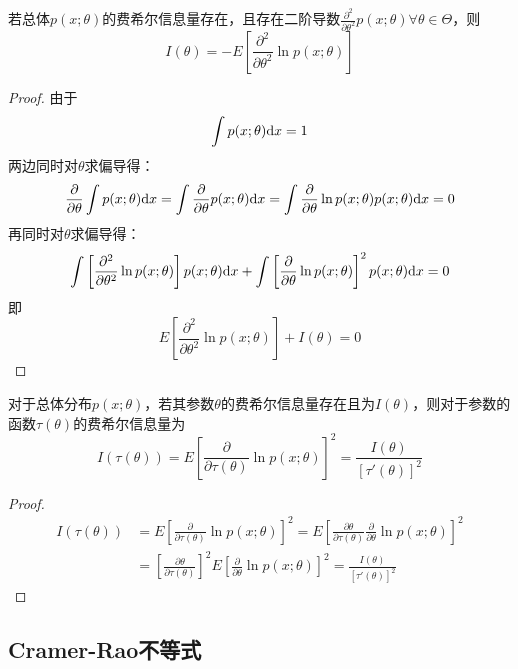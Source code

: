 \begin{proposition}
    若总体$p(x;\theta)$的费希尔信息量存在，且存在二阶导数$\frac{\partial^2}{\partial \theta^2}p(x;\theta) \forall \theta \in \Theta$，则
    \[ I(\theta)=-E\left[ \frac{\partial^2}{\partial \theta^2}\ln p(x;\theta) \right]  \]
\end{proposition}
\begin{proof}
    由于
    \[ \int p(x;\theta) \mathrm{d} x = 1 \]
    两边同时对$\theta$求偏导得：
    \[ \frac{\partial}{\partial \theta}\int p(x;\theta) \mathrm{d} x = \int \frac{\partial}{\partial \theta}p(x;\theta) \mathrm{d} x = \int \frac{\partial}{\partial \theta}\ln p(x;\theta) p(x;\theta) \mathrm{d} x=0 \]
    再同时对$\theta$求偏导得：
    \[ \int \left[ \frac{\partial^2}{\partial \theta^2}\ln p(x;\theta) \right] p(x;\theta) \mathrm{d} x + \int \left[\frac{\partial}{\partial \theta}\ln p(x;\theta)\right]^2 p(x;\theta) \mathrm{d} x =0 \]
    即
    \[ E\left[ \frac{\partial^2}{\partial \theta^2}\ln p(x;\theta) \right] + I(\theta)=0  \]
\end{proof}

\begin{proposition}
    对于总体分布$p(x ; \theta)$，若其参数$\theta$的费希尔信息量存在且为$I(\theta)$，则对于参数的函数$\tau(\theta)$的费希尔信息量为
    \[ I(\tau(\theta))=E\left[\frac{\partial}{\partial \tau(\theta)} \ln p(x ; \theta)\right]^2=\frac{I(\theta)}{[\tau'(\theta)]^2} \]
\end{proposition}
\begin{proof}
    \begin{align*}
        I(\tau(\theta)) & =E\left[\frac{\partial}{\partial \tau(\theta)} \ln p(x ; \theta)\right]^2=E\left[\frac{\partial \theta}{\partial \tau(\theta)} \frac{\partial }{\partial \theta} \ln p(x ; \theta)\right]^2 \\
                        & =[\frac{\partial \theta}{\partial \tau(\theta)}]^2 E \left[\frac{\partial}{\partial \theta} \ln p(x ; \theta)\right]^2 = \frac{I(\theta)}{[\tau'(\theta)]^2}
    \end{align*}
\end{proof}

\subsection{Cramer-Rao不等式}

